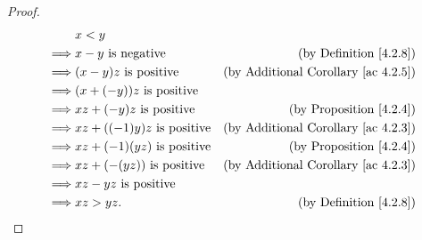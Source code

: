 \begin{proof}
    \begin{align*}
                 & x < y                                                                               \\
        \implies & x - y \text{ is negative}         & \text{(by Definition \ref{4.2.8})}              \\
        \implies & (x - y)z \text{ is positive}      & \text{(by Additional Corollary \ref{ac 4.2.5})} \\
        \implies & (x + (-y))z \text{ is positive}                                                     \\
        \implies & xz + (-y)z \text{ is positive}    & \text{(by Proposition \ref{4.2.4})}             \\
        \implies & xz + ((-1)y)z \text{ is positive} & \text{(by Additional Corollary \ref{ac 4.2.3})} \\
        \implies & xz + (-1)(yz) \text{ is positive} & \text{(by Proposition \ref{4.2.4})}             \\
        \implies & xz + (-(yz)) \text{ is positive}  & \text{(by Additional Corollary \ref{ac 4.2.3})} \\
        \implies & xz - yz \text{ is positive}                                                         \\
        \implies & xz > yz.                          & \text{(by Definition \ref{4.2.8})}
    \end{align*}
\end{proof}